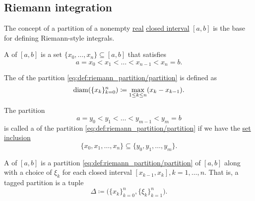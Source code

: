 \subsection{Riemann integration}\label{subsec:riemann_integration}

\begin{definition}\label{def:riemann_partition}\cite[def. 1]{Gordon1991}
  The concept of a partition of a nonempty \hyperref[def:real_numbers]{real} \hyperref[def:total_order_interval/closed]{closed interval} \( [a, b] \) is the base for defining Riemann-style integrals.

  \begin{DefEnum}
     A  of \( [a, b] \) is a set \( \{ x_0, \ldots, x_n \} \subseteq [a, b] \) that satisfies
    \begin{equation}\label{eq:def:riemann_partition/partition}
      a = x_0 < x_1 < \ldots < x_{n-1} < x_n = b.
    \end{equation}

     The  of the partition \eqref{eq:def:riemann_partition/partition} is defined as
    \begin{equation}\label{eq:def:riemann_partition/diameter}
      \operatorname{diam}(\{ x_k \}_{k=0}^n) \coloneqq \max_{1 \leq k \leq n} (x_k - x_{k-1}).
    \end{equation}

     The partition
    \begin{equation*}
      a = y_0 < y_1 < \ldots < y_{m-1} < y_m = b
    \end{equation*}
    is called a  of the partition \eqref{eq:def:riemann_partition/partition} if we have the \hyperref[def:subset]{set inclusion}
    \begin{equation}\label{eq:def:riemann_partition/refinement/inclusion}
      \{ x_0, x_1, \ldots, x_n \} \subseteq \{ y_0, y_1, \ldots, y_m \}.
    \end{equation}

     A  of \( [a, b] \) is a partition \eqref{eq:def:riemann_partition/partition} of \( [a, b] \) along with a choice of \( \xi_k \) for each closed interval \( [x_{k-1}, x_k], k = 1, \ldots, n \). That is, a tagged partition is a tuple
    \begin{equation}\label{eq:def:riemann_partition/tagged}
      \Delta \coloneqq \Big( \{ x_k \}_{k=0}^n, \{ \xi_k \}_{k=1}^n \Big).
    \end{equation}


\end{DefEnum}
\end{definition}
